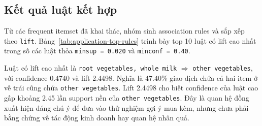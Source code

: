 \subsection{Kết quả luật kết hợp}
\label{subsec:application-association-rules}

Từ các frequent itemset đã khai thác, nhóm sinh association rules và sắp xếp theo \texttt{lift}. Bảng~\ref{tab:application-top-rules} trình bày top 10 luật có lift cao nhất trong số các luật thỏa \texttt{minsup = 0.020} và \texttt{minconf = 0.40}.

\begin{table}[H]
\centering
\caption{Top 10 luật kết hợp theo \texttt{lift}}
\label{tab:application-top-rules}
\end{table}

Luật có lift cao nhất là
\texttt{root vegetables, whole milk}
$\Rightarrow$
\texttt{other vegetables}, với confidence 0.4740 và lift 2.4498. Nghĩa là
47.40\% giao dịch chứa cả hai item ở vế trái cũng chứa
\texttt{other vegetables}. Lift 2.4498 cho biết confidence của luật cao gấp
khoảng 2.45 lần support nền của \texttt{other vegetables}. Đây là quan hệ đồng
xuất hiện đáng chú ý để đưa vào thử nghiệm gợi ý mua kèm, nhưng chưa phải bằng
chứng về tác động kinh doanh hay quan hệ nhân quả.

